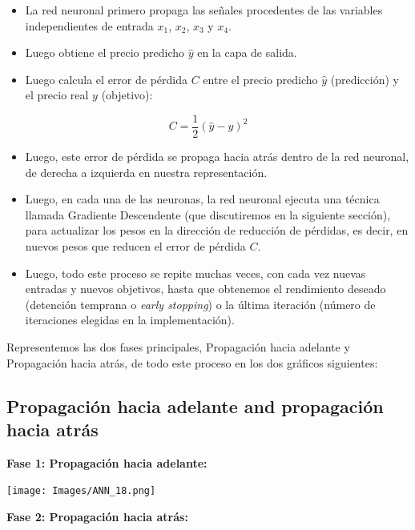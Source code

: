 \documentclass[
]{book}
\providecommand{\tightlist}{%
  \setlength{\itemsep}{0pt}\setlength{\parskip}{0pt}}
\begin{document}
\begin{itemize}
\tightlist
\item
  La red neuronal primero propaga las señales procedentes de las variables independientes de entrada \(x_1\), \(x_2\), \(x_3\) y \(x_4\).
\item
  Luego obtiene el precio predicho \(\hat{y}\) en la capa de salida.\\
\item
  Luego calcula el error de pérdida \(C\) entre el precio predicho \(\hat{y}\) (predicción) y el precio real \(y\) (objetivo):
\end{itemize}

\[C = \frac{1}{2} (\hat{y} - y)^2\]

\begin{itemize}
\tightlist
\item
  Luego, este error de pérdida se propaga hacia atrás dentro de la red neuronal, de derecha a izquierda en nuestra representación.\\
\item
  Luego, en cada una de las neuronas, la red neuronal ejecuta una técnica llamada Gradiente Descendente (que discutiremos en la siguiente sección), para actualizar los pesos en la dirección de reducción de pérdidas, es decir, en nuevos pesos que reducen el error de pérdida \(C\).\\
\item
  Luego, todo este proceso se repite muchas veces, con cada vez nuevas entradas y nuevos objetivos, hasta que obtenemos el rendimiento deseado (detención temprana o \emph{early stopping}) o la última iteración (número de iteraciones elegidas en la implementación).
\end{itemize}

Representemos las dos fases principales, Propagación hacia adelante y Propagación hacia atrás, de todo este proceso en los dos gráficos siguientes:

\hypertarget{propagaciuxf3n-hacia-adelante-and-propagaciuxf3n-hacia-atruxe1s}{%
\subsection{Propagación hacia adelante and propagación hacia atrás}\label{propagaciuxf3n-hacia-adelante-and-propagaciuxf3n-hacia-atruxe1s}}

\textbf{Fase 1: Propagación hacia adelante:}

\texttt{[image: Images/ANN\_18.png]}

\textbf{Fase 2: Propagación hacia atrás:}
\end{document}
